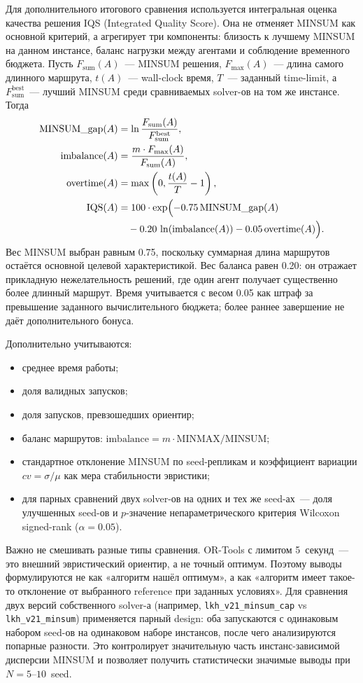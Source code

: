\documentclass[14pt,a4paper]{extarticle}
\begin{document}
Для дополнительного итогового сравнения используется интегральная оценка качества решения IQS (Integrated Quality Score). Она не отменяет MINSUM как основной критерий, а агрегирует три компоненты: близость к лучшему MINSUM на данном инстансе, баланс нагрузки между агентами и соблюдение временного бюджета. Пусть $F_{\mathrm{sum}}(A)$~--- MINSUM решения, $F_{\max}(A)$~--- длина самого длинного маршрута, $t(A)$~--- wall-clock время, $T$~--- заданный time-limit, а $F_{\mathrm{sum}}^{\mathrm{best}}$~--- лучший MINSUM среди сравниваемых solver-ов на том же инстансе. Тогда
\begin{align}
\mathrm{MINSUM\_gap}(A) &= \ln\frac{F_{\mathrm{sum}}(A)}{F_{\mathrm{sum}}^{\mathrm{best}}},\\
\mathrm{imbalance}(A) &= \frac{m \cdot F_{\max}(A)}{F_{\mathrm{sum}}(A)},\\
\mathrm{overtime}(A) &= \max\left(0, \frac{t(A)}{T} - 1\right),\\
\mathrm{IQS}(A) &= 100 \cdot \exp\Bigl(
-0.75\,\mathrm{MINSUM\_gap}(A) \nonumber\\
&\quad -0.20\,\ln(\mathrm{imbalance}(A))
-0.05\,\mathrm{overtime}(A)
\Bigr).
\end{align}
Вес MINSUM выбран равным 0.75, поскольку суммарная длина маршрутов остаётся основной целевой характеристикой. Вес баланса равен 0.20: он отражает прикладную нежелательность решений, где один агент получает существенно более длинный маршрут. Время учитывается с весом 0.05 как штраф за превышение заданного вычислительного бюджета; более раннее завершение не даёт дополнительного бонуса.

Дополнительно учитываются:
\begin{itemize}
  \item среднее время работы;
  \item доля валидных запусков;
  \item доля запусков, превзошедших ориентир;
  \item баланс маршрутов: $\mathrm{imbalance}=m \cdot \mathrm{MINMAX}/\mathrm{MINSUM}$;
  \item стандартное отклонение MINSUM по seed-репликам и коэффициент вариации $cv = \sigma / \mu$ как мера стабильности эвристики;
  \item для парных сравнений двух solver-ов на одних и тех же seed-ах~--- доля улучшенных seed-ов и $p$-значение непараметрического критерия Wilcoxon signed-rank ($\alpha = 0.05$).
\end{itemize}

Важно не смешивать разные типы сравнения. OR-Tools с лимитом 5~секунд~--- это внешний эвристический ориентир, а не точный оптимум. Поэтому выводы формулируются не как «алгоритм нашёл оптимум», а как «алгоритм имеет такое-то отклонение от выбранного reference при заданных условиях». Для сравнения двух версий собственного solver-а (например, \texttt{lkh\_v21\_minsum\_cap} vs \texttt{lkh\_v21\_minsum}) применяется парный design: оба запускаются с одинаковым набором seed-ов на одинаковом наборе инстансов, после чего анализируются попарные разности. Это контролирует значительную часть инстанс-зависимой дисперсии MINSUM и позволяет получить статистически значимые выводы при $N=5$--$10$~seed.
\end{document}
